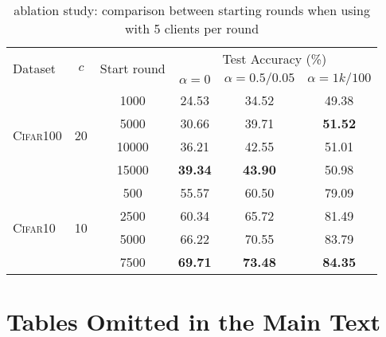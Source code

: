 \begin{table}[]\centering
\caption{\swa ablation study: comparison between \swa starting rounds when using \fedavg with 5 clients per round}\label{tab:abl_start}
\scriptsize
\setlength\tabcolsep{0.3cm}
    \begin{tabular}{lccccc}
    \toprule
    \multirow{2}{*}{Dataset} &\multirow{2}{*}{$c$} & \multirow{2}{*}{Start round}  &   \multicolumn{3}{c}{Test Accuracy (\%)} \\
    \cmidrule(l){4-6} 
    & & & $\alpha=0$ &  $\alpha=0.5/0.05$ &  $\alpha=1k/100$\\
    \midrule
    \multirow{4}{*}{\textsc{Cifar100}} & \multirow{4}{*}{20} & 1000& 24.53&34.52&49.38\\
    & & 5000&30.66&39.71&\textbf{51.52}\\
    & & 10000&36.21&42.55&51.01\\
    & & 15000&\textbf{39.34}&\textbf{43.90}&50.98\\
    \midrule
    \multirow{4}{*}{\textsc{Cifar10}} & \multirow{4}{*}{10} & 500& 55.57&60.50&79.09\\
    & & 2500&60.34&65.72&81.49\\
    & & 5000&66.22&70.55&83.79\\
    & & 7500&\textbf{69.71}&\textbf{73.48}&\textbf{84.35}\\
    \bottomrule
    \end{tabular}
\end{table}

\section{Tables Omitted in the Main Text}
